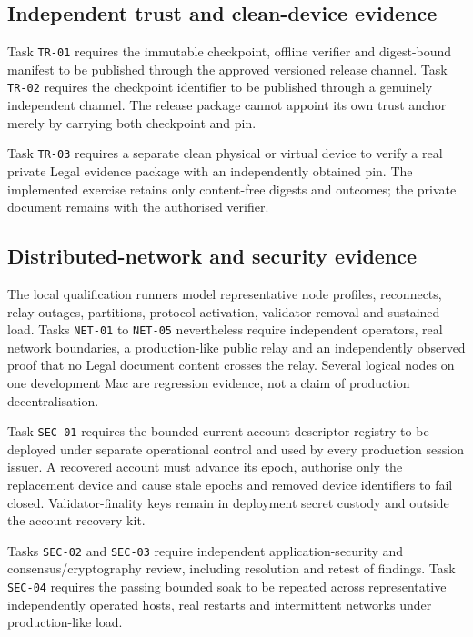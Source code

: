 \subsection{Independent trust and clean-device evidence}

Task \texttt{TR-01} requires the immutable checkpoint, offline verifier and
digest-bound manifest to be published through the approved versioned release
channel.  Task \texttt{TR-02} requires the checkpoint identifier to be published
through a genuinely independent channel.  The release package cannot appoint its
own trust anchor merely by carrying both checkpoint and pin.

Task \texttt{TR-03} requires a separate clean physical or virtual device to verify
a real private Legal evidence package with an independently obtained pin.  The
implemented exercise retains only content-free digests and outcomes; the private
document remains with the authorised verifier.

\subsection{Distributed-network and security evidence}

The local qualification runners model representative node profiles, reconnects,
relay outages, partitions, protocol activation, validator removal and sustained
load.  Tasks \texttt{NET-01} to \texttt{NET-05} nevertheless require independent
operators, real network boundaries, a production-like public relay and an
independently observed proof that no Legal document content crosses the relay.
Several logical nodes on one development Mac are regression evidence, not a claim
of production decentralisation.

Task \texttt{SEC-01} requires the bounded current-account-descriptor registry to be
deployed under separate operational control and used by every production session
issuer.  A recovered account must advance its epoch, authorise only the replacement
device and cause stale epochs and removed device identifiers to fail closed.
Validator-finality keys remain in deployment secret custody and outside the account
recovery kit.

Tasks \texttt{SEC-02} and \texttt{SEC-03} require independent application-security
and consensus/cryptography review, including resolution and retest of findings.
Task \texttt{SEC-04} requires the passing bounded soak to be repeated across
representative independently operated hosts, real restarts and intermittent
networks under production-like load.

